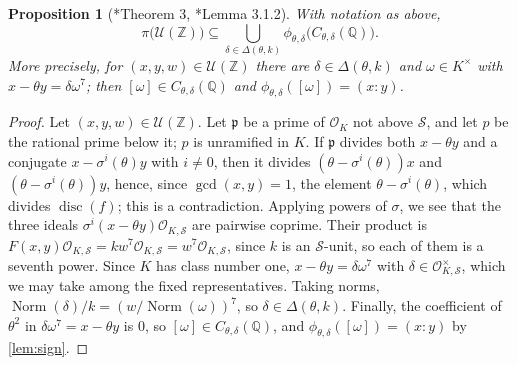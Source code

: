 \documentclass[12pt]{amsart}
\newcommand{\Q}{\mathbb{Q}}
\newcommand{\Z}{\mathbb{Z}}
\newcommand{\calS}{{\mathcal S}}
\newcommand{\calU}{{\mathcal U}}
\newcommand{\mcU}{\calU}
\newcommand{\OO}{{\mathcal O}}
\newcommand{\OKS}{\OO_{K,\calS}}
\newcommand{\mfp}{{\mathfrak p}}
\DeclareMathOperator{\disc}{disc}
\DeclareMathOperator{\Norm}{Norm}
\numberwithin{equation}{section}
\newtheorem{proposition}[theorem]{Proposition}
\theoremstyle{definition}
\begin{document}
\begin{proposition}[{\cite{Bruin06-nn2}*{Theorem 3}, \cite{Bruin02-thesis}*{Lemma 3.1.2}}]
  \label{prop:bruin}
  With notation as above,
  \[
    \pi\bigl(\mcU(\Z)\bigr) \subseteq \bigcup_{\delta \in \Delta(\theta,k)}
    \phi_{\theta,\delta}\bigl(C_{\theta,\delta}(\Q)\bigr).
  \]
  More precisely, for $(x,y,w) \in \mcU(\Z)$ there are $\delta \in \Delta(\theta,k)$ and
  $\omega \in K^{\times}$ with $x - \theta y = \delta\omega^7$; then $[\omega] \in
  C_{\theta,\delta}(\Q)$ and $\phi_{\theta,\delta}([\omega]) = (x:y)$.
\end{proposition}
\begin{proof}
  Let $(x,y,w) \in \mcU(\Z)$. Let $\mfp$ be a prime of $\OO_K$ not above
  $\calS$, and let $p$ be the rational prime below it; $p$ is unramified in
  $K$. If $\mfp$ divides both $x - \theta y$ and a conjugate
  $x - \sigma^{i}(\theta)y$ with $i \neq 0$, then it divides
  $(\theta - \sigma^{i}(\theta))x$ and $(\theta - \sigma^{i}(\theta))y$, hence, since
  $\gcd(x,y) = 1$, the element $\theta - \sigma^{i}(\theta)$, which divides
  $\disc(f)$; this is a contradiction. Applying powers of $\sigma$, we see that
  the three ideals $\sigma^{i}(x - \theta y)\OKS$ are pairwise coprime. Their
  product is $F(x,y)\OKS = kw^7\OKS = w^7\OKS$, since $k$ is an $\calS$-unit, so
  each of them is a seventh power. Since $K$ has class number one,
  $x - \theta y = \delta\omega^7$ with $\delta \in \OKS^{\times}$, which we may take among the fixed
  representatives. Taking norms, $\Norm(\delta)/k = (w/\Norm(\omega))^{7}$, so
  $\delta \in \Delta(\theta,k)$. Finally, the coefficient of $\theta^2$ in
  $\delta\omega^7 = x - \theta y$ is $0$, so
  $[\omega] \in C_{\theta,\delta}(\Q)$, and $\phi_{\theta,\delta}([\omega]) = (x:y)$ by \cref{lem:sign}.
\end{proof}
\end{document}
